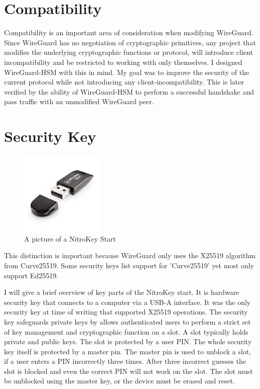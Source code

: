\documentclass [11pt, proquest] {uwthesis}[2020/02/24]
\begin{document}
\section{Compatibility}
Compatibility is an important area of consideration when modifying WireGuard. Since WireGuard has no negotiation of cryptographic primitives, any project that modifies the underlying cryptographic functions or protocol, will introduce client incompatibility and be restricted to working with only themselves. I designed WireGuard-HSM with this in mind. My goal was to improve the security of the current protocol while not introducing any client-incompatibility. This is later verified by the ability of WireGuard-HSM to perform a successful handshake and pass traffic with an unmodified WireGuard peer.

\section{Security Key}
\begin{figure}[ht]
\includegraphics[width=4cm]{paper/images/nitrokey.jpg}
\caption{A picture of a NitroKey Start}
\label{nitrokey}
\end{figure}

This distinction is important because WireGuard only uses the X25519 algorithm from Curve25519. Some security keys list support for 'Curve25519' yet most only support Ed25519.

I will give a brief overview of key parts of the NitroKey start. It is hardware security key that connects to a computer via a USB-A interface. It was the only security key at time of writing that supported X25519 operations.
The security key safeguards private keys by allows authenticated users to perform a strict set of key management and cryptographic function on a slot. A slot typically holds private and public keys. The slot is protected by a user PIN. The whole security key itself is protected by a master pin. The master pin is used to unblock a slot, if a user enters a PIN incorrectly three times. After three incorrect guesses the slot is blocked and even the correct PIN will not work on the slot. The slot must be unblocked using the master key, or the device must be erased and reset.
\end{document}
